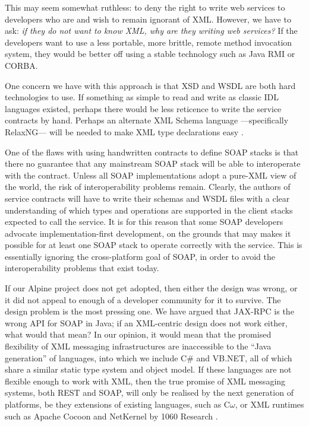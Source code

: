 This may seem somewhat ruthless: to deny the right to write web
services to developers who are and wish to remain ignorant of XML.
However, we have to ask: \emph{if they do not want to know XML, why are
they writing web services?} If the developers want to use a less portable,
more brittle, remote method invocation system, they would be better off
using a stable technology such as Java RMI or CORBA.

One concern we have with this approach is that XSD and WSDL are both hard
technologies to use. If something as simple to read and write as classic IDL
languages existed, perhaps there would be less reticence to write the service
contracts by hand. Perhaps an alternate XML Schema language ---specifically
RelaxNG--- will be needed to make XML type declarations easy
\cite{spec:RelaxNG}. 

One of the flaws with using handwritten contracts to define SOAP stacks is that
there no guarantee that any mainstream SOAP stack will be able to interoperate
with the contract. Unless all SOAP implementations adopt a pure-XML view of the
world, the risk of interoperability problems remain. Clearly, the authors of
service contracts will have to write their schemas and WSDL files with a clear
understanding of which types and operations are supported in the client stacks
expected to call the service. It is for this reason that some SOAP developers
advocate implementation-first development, on the grounds that may makes it
possible for at least one SOAP stack to operate correctly with the service. This
is essentially ignoring the cross-platform goal of SOAP, in order to avoid the
interoperability problems that exist today.

If our Alpine project does not get adopted, then either the design was wrong,
or it did not appeal to enough of a developer community for it to survive. The
design problem is the most pressing one. We have argued that JAX-RPC is the
wrong API for SOAP in Java; if an XML-centric design does not work either, what
would that mean? In our opinion, it would mean that the promised flexibility of
XML messaging infrastructures are inaccessible to the ``Java generation'' of
languages, into which we include C\# and VB.NET, all of which share a similar
static type system and object model. If these languages are not flexible enough
to work with XML, then the true promise of XML messaging systems, both REST and
SOAP, will only be realised by the next generation of platforms, be they
extensions of existing languages, such as C$\omega$, or XML runtimes such as
Apache Cocoon and NetKernel by 1060 Research
\cite{MSFT:TransitionsInProgrammingModels,pjr:NKonXml}.
